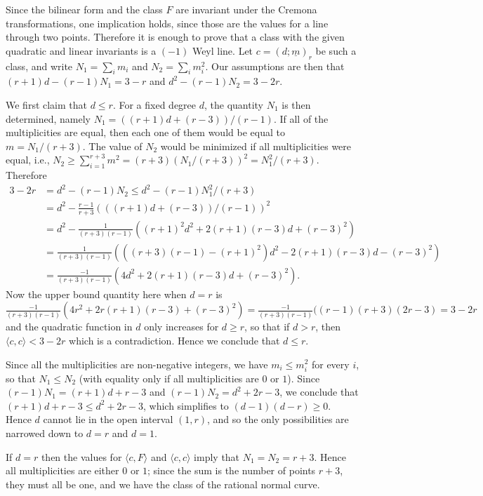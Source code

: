 \documentclass[12pt]{article}
\numberwithin{equation}{section}
\numberwithin{subeq}{equation}
\begin{document}
\medskip{}
Since the bilinear form and the class $F$ are invariant under the Cremona transformations,
one implication holds, since those are the values for a line through two points.
Therefore it is enough to prove that a class with the given quadratic and linear invariants
is a $(-1)$ Weyl line.
Let $c = (d;\underline{m})_r$ be such a class, and write
$N_1 = \sum_i m_i$ and $N_2 = \sum_i m_i^2$.
Our assumptions are then that $(r+1)d-(r-1)N_1 = 3-r$
and $d^2-(r-1)N_2 = 3-2r$.

We first claim that $d \leq r$.
For a fixed degree $d$, the quantity $N_1$ is then determined,
namely $N_1 = ((r+1)d + (r-3))/(r-1)$.
If all of the multiplicities are equal,
then each one of them would be equal to $m=N_1/(r+3)$.
The value of $N_2$ would be minimized if all multiplicities were equal, i.e.,
$N_2 \geq \sum_{i=1}^{r+3} m^2 = (r+3)(N_1/(r+3))^2 = N_1^2/(r+3)$.
Therefore
\begin{align*}
3-2r &= d^2-(r-1)N_2 \leq d^2 - (r-1) N_1^2/(r+3) \\
&= d^2 - \frac{r-1}{r+3}(((r+1)d + (r-3))/(r-1))^2 \\
&= d^2 - \frac{1}{(r+3)(r-1)} ((r+1)^2 d^2 + 2(r+1)(r-3) d + (r-3)^2) \\
&= \frac{1}{(r+3)(r-1)} ( ((r+3)(r-1)-(r+1)^2)d^2 - 2(r+1)(r-3) d - (r-3)^2 ) \\
&= \frac{-1}{(r+3)(r-1)} ( 4d^2 + 2(r+1)(r-3) d + (r-3)^2 ).
\end{align*}
Now the upper bound quantity here when $d=r$ is
$\frac{-1}{(r+3)(r-1)} (4r^2 + 2r(r+1)(r-3) + (r-3)^2 )
= \frac{-1}{(r+3)(r-1)}((r-1)(r+3)(2r-3) = 3-2r$
and the quadratic function in $d$ only increases for $d \geq r$,
so that if $d > r$, then $ \langle c, c \rangle < 3-2r$ which is a contradiction.
Hence we conclude that $d \leq r$.

Since all the multiplicities are non-negative integers,
we have $m_i \leq m_i^2$ for every $i$,
so that $N_1 \leq N_2$ (with equality only if all multiplicities are $0$ or $1$).
Since $(r-1)N_1 = (r+1)d+r-3$ and $(r-1)N_2 = d^2+2r-3$, we conclude that
$(r+1)d+r-3 \leq d^2+2r-3$,
which simplifies to $(d-1)(d-r) \geq 0$.
Hence $d$ cannot lie in the open interval $(1,r)$,
and so the only possibilities are narrowed down to $d=r$ and $d=1$.

If $d=r$ then the values for $ \langle c, F \rangle$ and  $\langle c, c \rangle$ imply that $N_1 = N_2 = r+3$.
Hence all multiplicities are either $0$ or $1$; since the sum is the number of points $r+3$, they must all be one, and we have the class of the rational normal curve.
\end{document}
